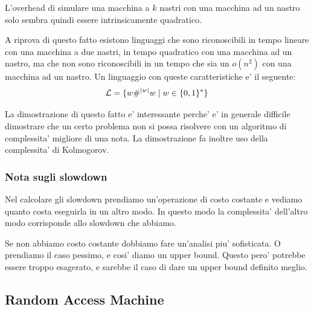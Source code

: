 %

L'overhead di simulare una macchina a $k$ nastri con una macchina ad un nastro solo sembra quindi
essere intrinsicamente quadratico.



A riprova di questo fatto esistono linguaggi che sono riconoscibili in tempo lineare con una
macchina a due nastri, in tempo quadratico con una macchina ad un nastro, ma che non sono
riconoscibili in un tempo che sia un $o(n^{2})$ con una macchina ad un nastro. Un linguaggio con
queste caratteristiche e' il seguente:
\begin{equation*}
    \mathcal{L} = \{w\#^{|w|}w \mid w \in \{0,1\}^{*}\}
\end{equation*}

La dimostrazione di questo fatto e' interessante perche' e' in generale difficile dimostrare che un
certo problema non si possa risolvere con un algoritmo di complessita' migliore di una nota. La
dimostrazione fa inoltre uso della complessita' di Kolmogorov.

\subsubsection{Nota sugli slowdown}

Nel calcolare gli slowdown prendiamo un'operazione di costo costante e vediamo quanto costa
eseguirla in un altro modo. In questo modo la complessita' dell'altro modo corrisponde allo slowdown
che abbiamo.

Se non abbiamo costo costante dobbiamo fare un'analisi piu' sofisticata. O prendiamo il caso
pessimo, e cosi' diamo un upper bound. Questo pero' potrebbe essere troppo esagerato, e sarebbe il
caso di dare un upper bound definito meglio.

\subsection{Random Access Machine}

